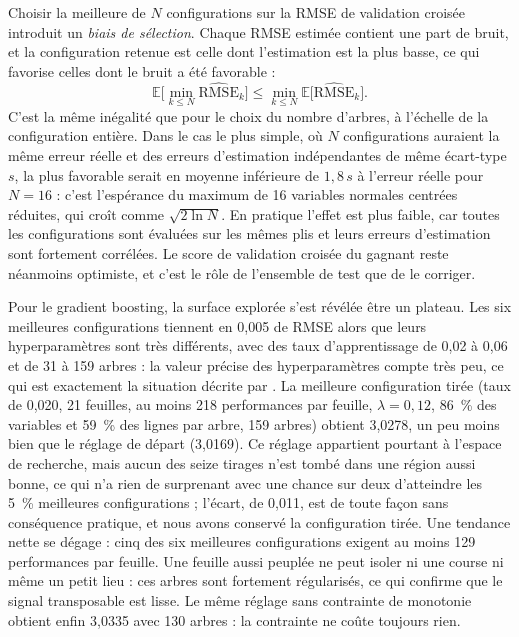 \documentclass[11pt,a4paper]{article}
\newcommand{\E}{\mathbb{E}}
\begin{document}
Choisir la meilleure de $N$ configurations sur la RMSE de validation croisée introduit un \emph{biais de sélection}.
Chaque RMSE estimée contient une part de bruit, et la configuration retenue est celle dont l'estimation est la plus
basse, ce qui favorise celles dont le bruit a été favorable :
\[
\E\Big[\min_{k \leq N} \widehat{\mathrm{RMSE}}_k\Big] \leq \min_{k \leq N} \E\big[\widehat{\mathrm{RMSE}}_k\big] .
\]
C'est la même inégalité que pour le choix du nombre d'arbres, à l'échelle de la configuration entière. Dans le cas le
plus simple, où $N$ configurations auraient la même erreur réelle et des erreurs d'estimation indépendantes de même
écart-type $s$, la plus favorable serait en moyenne inférieure de $1{,}8\,s$ à l'erreur réelle pour $N = 16$ :
c'est l'espérance du maximum de 16 variables normales centrées réduites, qui croît comme $\sqrt{2\ln N}$. En
pratique l'effet est plus faible, car toutes les configurations sont évaluées sur les mêmes plis et leurs erreurs
d'estimation sont fortement corrélées. Le score de validation croisée du gagnant reste néanmoins optimiste, et c'est
le rôle de l'ensemble de test que de le corriger.

Pour le gradient boosting, la surface explorée s'est révélée être un plateau. Les six meilleures configurations
tiennent en 0,005 de RMSE alors que leurs hyperparamètres sont très différents, avec des taux d'apprentissage de 0,02
à 0,06 et de 31 à 159 arbres : la valeur précise des hyperparamètres compte très peu, ce qui est exactement la
situation décrite par \citet{bergstra2012}. La meilleure configuration tirée (taux de 0,020, 21 feuilles, au moins 218
performances par feuille, $\lambda = 0{,}12$, 86~\% des variables et 59~\% des lignes par arbre, 159 arbres) obtient
3,0278, un peu moins bien que le réglage de départ (3,0169). Ce réglage appartient pourtant à l'espace de recherche,
mais aucun des seize tirages n'est tombé dans une région aussi bonne, ce qui n'a rien de surprenant avec une chance
sur deux d'atteindre les 5~\% meilleures configurations ; l'écart, de 0,011, est de toute façon sans conséquence
pratique, et nous avons conservé la configuration tirée. Une tendance nette se dégage : cinq des six meilleures
configurations exigent au moins 129 performances par feuille. Une feuille aussi peuplée ne peut isoler ni une course
ni même un petit lieu : ces arbres sont fortement régularisés, ce qui confirme que le signal transposable est lisse.
Le même réglage sans contrainte de monotonie obtient enfin 3,0335 avec 130 arbres : la contrainte ne coûte toujours
rien.
\end{document}
